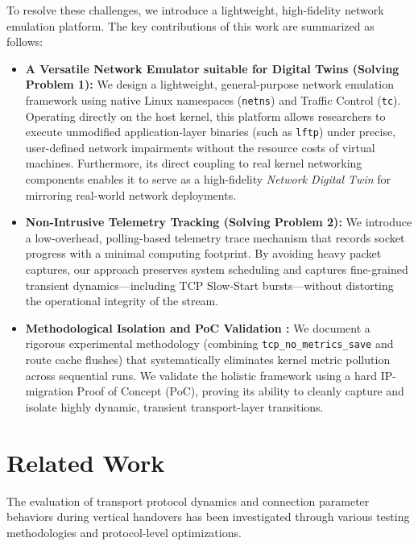 \documentclass[conference]{IEEEtran}
\begin{document}
To resolve these challenges, we introduce a lightweight, high-fidelity network emulation platform. The key contributions of this work are summarized as follows:

\begin{itemize}
    \item \textbf{A Versatile Network Emulator suitable for Digital Twins (Solving Problem 1):} 
    We design a lightweight, general-purpose network emulation framework using native Linux namespaces (\texttt{netns}) and Traffic Control (\texttt{tc}). Operating directly on the host kernel, this platform allows researchers to execute unmodified application-layer binaries (such as \texttt{lftp}) under precise, user-defined network impairments without the resource costs of virtual machines. Furthermore, its direct coupling to real kernel networking components enables it to serve as a high-fidelity \textit{Network Digital Twin} for mirroring real-world network deployments.

    \item \textbf{Non-Intrusive Telemetry Tracking (Solving Problem 2):} 
    We introduce a low-overhead, polling-based telemetry trace mechanism that records socket progress with a minimal computing footprint. By avoiding heavy packet captures, our approach preserves system scheduling and captures fine-grained transient dynamics—including TCP Slow-Start bursts—without distorting the operational integrity of the stream.

    \item \textbf{Methodological Isolation and PoC Validation :} 
    We document a rigorous experimental methodology (combining \texttt{tcp\_no\_metrics\_save} and route cache flushes) that systematically eliminates kernel metric pollution across sequential runs. We validate the holistic framework using a hard IP-migration Proof of Concept (PoC), proving its ability to cleanly capture and isolate highly dynamic, transient transport-layer transitions.
\end{itemize}

\section{Related Work}
The evaluation of transport protocol dynamics and connection parameter behaviors during vertical handovers has been investigated through various testing methodologies and protocol-level optimizations.
\end{document}
